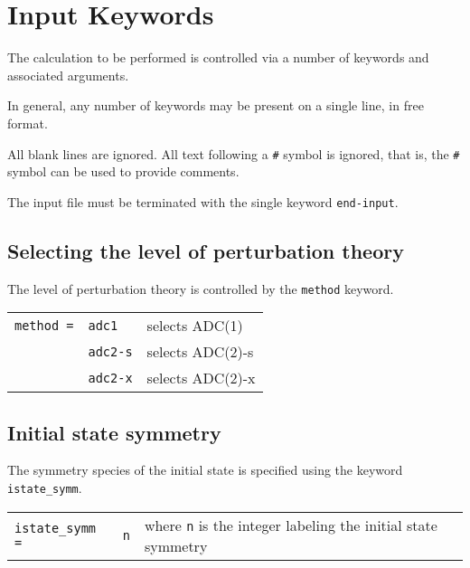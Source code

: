 \documentclass[12pt]{article}
\newcommand*\code[1]{\mbox{\texttt{{#1}}}} %
\begin{document}
\section*{Input Keywords}

\noindent
The calculation to be performed is controlled via a number of keywords
and associated arguments.

\vspace{0.2cm}
\noindent
In general, any number of keywords may be present on a single line, in
free format.

\vspace{0.2cm}
\noindent
All blank lines are ignored. All text following a \code{\#} symbol is
ignored, that is, the \code{\#} symbol can be used to provide
comments.

\vspace{0.2cm}
\noindent
The input file must be terminated with the single keyword
\code{end-input}.

\subsection*{Selecting the level of perturbation theory}
\noindent
The level of perturbation theory is controlled by the \code{method} keyword.

\begin{table}[h]
\vspace*{1.7ex}
\begin{center}
\begin{tabular}{llp{2.5in}}
\code{method =} & \code{adc1}   & selects ADC(1) \\
                & \code{adc2-s} & selects ADC(2)-s \\
                & \code{adc2-x} & selects ADC(2)-x \\
\end{tabular}
\end{center}
\end{table}

\subsection*{Initial state symmetry}
\noindent
The symmetry species of the initial state is specified using the
keyword \code{istate\_symm}.

\begin{table}[h]
\vspace*{1.7ex}
\begin{center}
\begin{tabular}{llp{2.5in}}
\code{istate\_symm =} & \code{n}   & where \code{n} is the integer labeling the initial state symmetry \\
\end{tabular}
\end{center}
\end{table}
\end{document}
